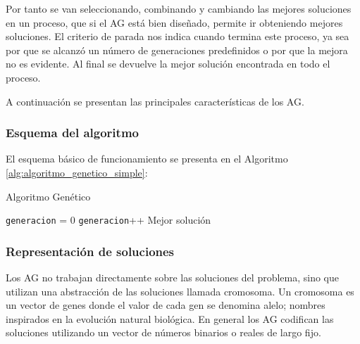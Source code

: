 Por tanto se van seleccionando, combinando y cambiando las mejores soluciones en un proceso, que si el AG está bien diseñado, permite ir obteniendo mejores soluciones.
El criterio de parada nos indica cuando termina este proceso, ya sea por que se alcanzó un número de generaciones predefinidos o por que la mejora no es evidente. Al final se devuelve la mejor solución encontrada en todo el proceso.


A continuación se presentan las principales características de los AG.

\subsubsection{Esquema del algoritmo}

El esquema básico de funcionamiento se presenta en el Algoritmo \ref{alg:algoritmo_genetico_simple}:


\begin{algorithm}[H]
	\caption{Algoritmo Genético}
	\label{alg:algoritmo_genetico_simple}
	\begin{algorithmic} [1] 
		{
			\STATE \texttt{generacion} = 0
			\STATE \texttt{generacion}++
			\ENDWHILE
			\RETURN Mejor solución
		}
	\end{algorithmic}
\end{algorithm}



\subsubsection{Representación de soluciones}
Los AG no trabajan directamente sobre las soluciones del problema, sino que utilizan una abstracción de las soluciones llamada cromosoma. Un cromosoma es un vector de genes donde el valor de cada gen se denomina alelo; nombres inspirados en la evolución natural biológica.
En general los AG codifican las soluciones utilizando un vector de números binarios o reales de largo fijo.

